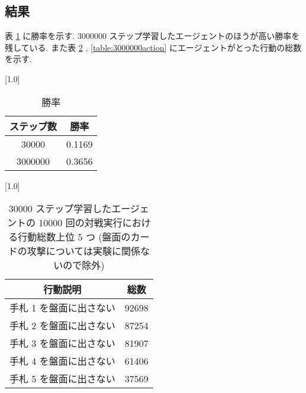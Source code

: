 \documentclass{jarticle}     %
\begin{document}
  
      
  \subsection{結果}

  表 \ref{table:resultwinrate} に勝率を示す. 3000000 ステップ学習したエージェントのほうが高い勝率を残している. また表 \ref{table:30000action} , \ref{table:3000000action} にエージェントがとった行動の総数を示す.
  \begin{table}[ht]
    \centering
    \caption{勝率}
    \vspace{-0.3cm}
    \label{table:resultwinrate}
    \scalebox{1.0}[1.0]{
      \begin{tabular}{|c|c|}
        \hline
        ステップ数 & 勝率 \\ \hline
        30000 & 0.1169 \\ \hline
        3000000 & 0.3656 \\ \hline
        \end{tabular}
    }
    \end{table}
  
    \begin{table}[ht]
      \centering
      \caption{30000 ステップ学習したエージェントの 10000 回の対戦実行における行動総数上位 5 つ (盤面のカードの攻撃については実験に関係ないので除外)}
      \vspace{-0.3cm}
      \label{table:30000action}
      \scalebox{1.0}[1.0]{
        \begin{tabular}{|c|c|}
          \hline
          行動説明 & 総数 \\ \hline
          手札 1 を盤面に出さない & 92698 \\ \hline
          手札 2 を盤面に出さない & 87254 \\ \hline
          手札 3 を盤面に出さない & 81907 \\ \hline
          手札 4 を盤面に出さない & 61406 \\ \hline
          手札 5 を盤面に出さない & 37569 \\ \hline
          \end{tabular}
      }
      \end{table}
    
\end{document}
